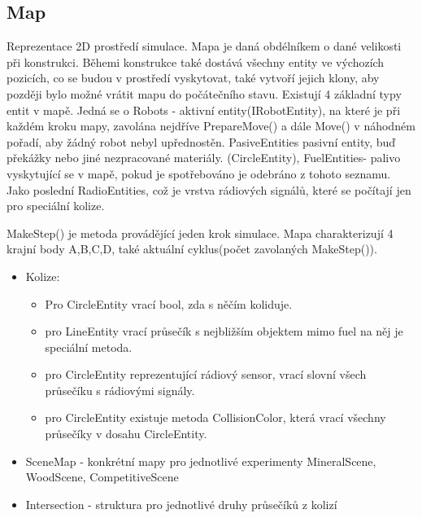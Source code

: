 \documentclass[12pt, oneside]{article}
\begin{document}
\subsection{Map} 
Reprezentace 2D prostředí simulace. Mapa je daná obdélníkem o dané velikosti při konstrukci. Běhemi konstrukce také dostává všechny entity ve výchozích pozicích, co se budou v prostředí vyskytovat, také vytvoří jejich klony, aby později bylo možné vrátit mapu do  počátečního stavu. Existují 4 základní typy entit v mapě. Jedná se o  Robots - aktivní entity(IRobotEntity), na které je při každém kroku mapy, zavolána nejdříve PrepareMove() a dále Move() v náhodném pořadí, aby žádný robot nebyl upřednostěn. PasiveEntities pasivní entity, buď překážky nebo jiné nezpracované materiály. (CircleEntity), FuelEntities- palivo vyskytující se v mapě, pokud je spotřebováno je odebráno z tohoto seznamu. Jako poslední RadioEntities, což je vrstva rádiových signálů, které se počítají jen pro speciální kolize. \par 
MakeStep()  je metoda provádějící jeden krok simulace. 
Mapa charakterizují 4 krajní body A,B,C,D, také aktuální cyklus(počet zavolaných MakeStep()).
\begin{itemize}
	\item Kolize: 
	\begin{itemize}
		\item Pro CircleEntity vrací bool, zda s něčím koliduje. 
		\item pro LineEntity vrací průsečík s nejbližším objektem mimo fuel na něj  je speciální metoda. 
		\item pro CircleEntity reprezentující rádiový sensor, vrací slovní všech průsečíku s rádiovými  signály. 
		\item pro  CircleEntity existuje metoda CollisionColor, která vrací všechny průsečíky v dosahu CircleEntity.
	\end{itemize} 
	\item SceneMap - konkrétní mapy pro jednotlivé experimenty MineralScene, WoodScene, CompetitiveScene
	\item Intersection - struktura pro  jednotlivé druhy průsečíků z kolizí
\end{itemize} 
\newpage
\end{document}
